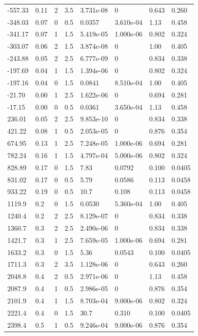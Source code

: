 \documentclass[preview]{standalone}
\begin{document}
{{\begin{tabular}{L{1.2cm}C{1.2cm} C{0.3cm}C{0.5cm} C{1.4cm}C{1.4cm} C{1.4cm}C{1.4cm}}
  -557.33  &  0.11  & 2     & 3.5 &  3.731e-08  & 0  & 0.643 &  0.260   \\ 
  -348.03  &  0.07  & 0     & 0.5 &  0.0357  & 3.610e-04  & 1.13 &  0.458   \\ 
  -341.17  &  0.07  & 1     & 1.5 &  5.419e-05  & 1.000e-06  & 0.802 &  0.324   \\ 
  -303.07  &  0.06  & 2     & 1.5 &  3.874e-08  & 0  & 1.00 &  0.405   \\ 
  -243.88  &  0.05  & 2     & 2.5 &  6.777e-09  & 0  & 0.834 &  0.338   \\ 
  -197.69  &  0.04  & 1     & 1.5 &  1.394e-06  & 0  & 0.802 &  0.324   \\ 
  -197.16  &  0.04  & 0     & 1.5 &  0.0841  & 8.510e-04  & 1.00 &  0.405   \\ 
  -21.70  &  0.00  & 1     & 2.5 &  1.622e-06  & 0  & 0.694 &  0.281   \\ 
  -17.15  &  0.00  & 0     & 0.5 &  0.0361  & 3.650e-04  & 1.13 &  0.458   \\ 
  236.01  &  0.05  & 2     & 2.5 &  9.853e-10  & 0  & 0.834 &  0.338   \\ 
  421.22  &  0.08  & 1     & 0.5 &  2.053e-05  & 0  & 0.876 &  0.354   \\ 
  674.95  &  0.13  & 1     & 2.5 &  7.248e-05  & 1.000e-06  & 0.694 &  0.281   \\ 
  782.24  &  0.16  & 1     & 1.5 &  4.797e-04  & 5.000e-06  & 0.802 &  0.324   \\ 
  828.89  &  0.17  & 0     & 1.5 &  7.83  & 0.0792  & 0.100 &  0.0405   \\ 
  831.02  &  0.17  & 0     & 0.5 &  5.79  & 0.0586  & 0.113 &  0.0458   \\ 
  933.22  &  0.19  & 0     & 0.5 &  10.7  & 0.108  & 0.113 &  0.0458   \\ 
  1119.9  &   0.2  & 0     & 1.5 &  0.0530  & 5.360e-04  & 1.00 &  0.405   \\ 
  1240.4  &   0.2  & 2     & 2.5 &  8.129e-07  & 0  & 0.834 &  0.338   \\ 
  1360.7  &   0.3  & 2     & 2.5 &  2.490e-06  & 0  & 0.834 &  0.338   \\ 
  1421.7  &   0.3  & 1     & 2.5 &  7.659e-05  & 1.000e-06  & 0.694 &  0.281   \\ 
  1633.2  &   0.3  & 0     & 1.5 &  5.36  & 0.0543  & 0.100 &  0.0405   \\ 
  1711.3  &   0.3  & 2     & 3.5 &  1.128e-06  & 0  & 0.643 &  0.260   \\ 
  2048.8  &   0.4  & 2     & 0.5 &  2.971e-06  & 0  & 1.13 &  0.458   \\ 
  2087.9  &   0.4  & 1     & 0.5 &  2.986e-05  & 0  & 0.876 &  0.354   \\ 
  2101.9  &   0.4  & 1     & 1.5 &  8.703e-04  & 9.000e-06  & 0.802 &  0.324   \\ 
  2221.4  &   0.4  & 0     & 1.5 &  30.7  & 0.310  & 0.100 &  0.0405   \\ 
  2398.4  &   0.5  & 1     & 0.5 &  9.246e-04  & 9.000e-06  & 0.876 &  0.354   \\ 
\hline 
\end{tabular} 

}}
\end{document}
